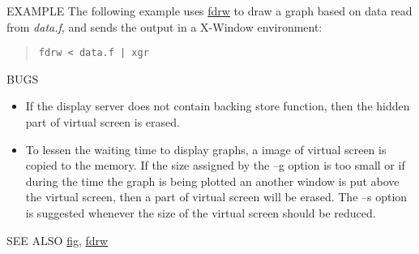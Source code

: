 \begin{options}
\end{options}
\begin{qsection}{EXAMPLE}
The following example uses \hyperlink{fdrw}{fdrw} to draw a graph based on data read
from {\em data.f}, and sends the output in a X-Window environment:
\begin{quote}
 \verb!fdrw < data.f | xgr!
\end{quote}
\end{qsection}
\begin{qsection}{BUGS}
\begin{itemize}
\item If the display server does not contain backing store function,
then the hidden part of virtual screen is erased.

\item To lessen the waiting time to display graphs,
a image of virtual screen is copied to the memory.
If the size assigned by the --g option is too small
or if during the time the graph is being plotted an another window
is put above the virtual screen, then a part of virtual screen
will be erased.
The --s option is suggested whenever the size of
the virtual screen should be reduced.
\end{itemize}

\end{qsection}
\begin{qsection}{SEE ALSO}
\hyperlink{fig}{fig},
\hyperlink{fdrw}{fdrw}
\end{qsection}
